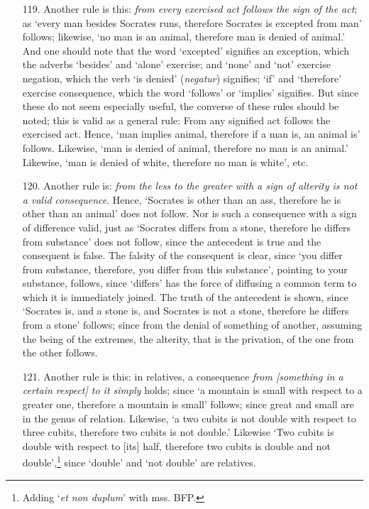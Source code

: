 \documentclass[]{article}
\begin{document}
\begin{itemize}
\item[119.] Another rule is this: \textit{from every exercised act follows the sign of the act}; as `every man besides Socrates runs, therefore Socrates is excepted from man' follows; likewise, `no man is an animal, therefore man is denied of animal.' And one should note that the word `excepted' signifies an exception, which the adverbs `besides' and `alone' exercise; and `none' and `not' exercise negation, which the verb `is denied' (\textit{negatur}) signifies; `if' and `therefore' exercise consequence, which the word `follows' or `implies' signifies. But since these do not seem especially useful, the converse of these rules should be noted; this is valid as a general rule: From any signified act follows the exercised act. Hence, `man implies animal, therefore if a man is, an animal is' follows. Likewise, `man is denied of animal, therefore no man is an animal.' Likewise, `man is denied of white, therefore no man is white', etc.
\item[120.] Another rule is: \textit{from the less to the greater with a sign of alterity is not a valid consequence}. Hence, `Socrates is other than an ass, therefore he is other than an animal' does not follow. Nor is such a consequence with a sign of difference valid, just as `Socrates differs from a stone, therefore he differs from substance' does not follow, since the antecedent is true and the consequent is false. The falsity of the consequent is clear, since `you differ from substance, therefore, you differ from this substance', pointing to your substance, follows, since `differs' has the force of diffusing a common term to which it is immediately joined. The truth of the antecedent is shown, since `Socrates is, and a stone is, and Socrates is not a stone, therefore he differs from a stone' follows; since from the denial of something of another, assuming the being of the extremes, the alterity, that is the privation, of the one from the other follows.
\item[121.] Another rule is this: in relatives, a consequence \textit{from [something in a certain respect] to it simply} holds; since `a mountain is small with respect to a greater one, therefore a mountain is small' follows; since great and small are in the genus of relation. Likewise, `a two cubits is not double with respect to three cubits, therefore two cubits is not double.' Likewise `Two cubits is double with respect to [its] half, therefore two cubits is double and not double',\footnote{Adding `\textit{et non duplum}' with mss. BFP.} since `double' and `not double' are relatives.

\end{itemize}
\end{document}
